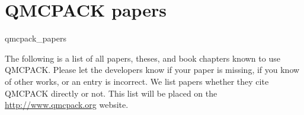 \chapter{QMCPACK papers}
\begin{btSect}{qmcpack_papers}

  The following is a list of all papers, theses, and book chapters
  known to use QMCPACK. Please let the developers know if your paper
  is missing, if you know of other works, or an entry is incorrect. We
  list papers whether they cite QMCPACK directly or not. This list
  will be placed on the \url{http://www.qmcpack.org} website.

\btPrintAll

\end{btSect}
 